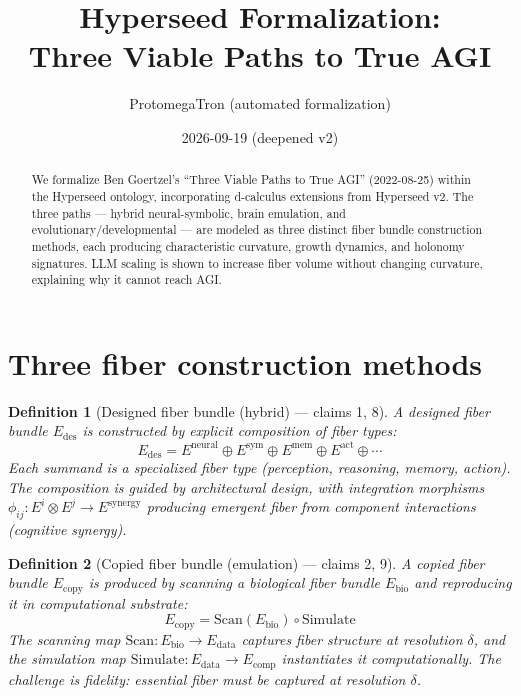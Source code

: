 \documentclass[11pt,a4paper]{article}
\title{Hyperseed Formalization:\\
  Three Viable Paths to True AGI}
\author{ProtomegaTron (automated formalization)}
\date{2026-09-19 (deepened v2)}
\newtheorem{definition}{Definition}[section]
\begin{document}
\maketitle

\begin{abstract}
We formalize Ben Goertzel's ``Three Viable Paths to True AGI''
(2022-08-25) within the Hyperseed ontology, incorporating d-calculus
extensions from Hyperseed v2. The three paths --- hybrid neural-symbolic,
brain emulation, and evolutionary/developmental --- are modeled as three
distinct fiber bundle construction methods, each producing characteristic
curvature, growth dynamics, and holonomy signatures. LLM scaling is shown
to increase fiber volume without changing curvature, explaining why it
cannot reach AGI.
\end{abstract}

\tableofcontents

\section{Three fiber construction methods}

\begin{definition}[Designed fiber bundle (hybrid) --- claims 1, 8]
A \emph{designed fiber bundle} $E_{\text{des}}$ is constructed by explicit
composition of fiber types:
\[
  E_{\text{des}} = E^{\text{neural}} \oplus E^{\text{sym}} \oplus
    E^{\text{mem}} \oplus E^{\text{act}} \oplus \cdots
\]
Each summand is a specialized fiber type (perception, reasoning, memory,
action). The composition is guided by architectural design, with
integration morphisms $\phi_{ij}: E^i \otimes E^j \to E^{\text{synergy}}$
producing emergent fiber from component interactions (cognitive synergy).
\end{definition}

\begin{definition}[Copied fiber bundle (emulation) --- claims 2, 9]
A \emph{copied fiber bundle} $E_{\text{copy}}$ is produced by scanning a
biological fiber bundle $E_{\text{bio}}$ and reproducing it in
computational substrate:
\[
  E_{\text{copy}} = \text{Scan}(E_{\text{bio}}) \circ \text{Simulate}
\]
The scanning map $\text{Scan}: E_{\text{bio}} \to E_{\text{data}}$
captures fiber structure at resolution $\delta$, and the simulation map
$\text{Simulate}: E_{\text{data}} \to E_{\text{comp}}$ instantiates it
computationally. The challenge is fidelity: essential fiber must be
captured at resolution $\delta$.
\end{definition}
\end{document}
